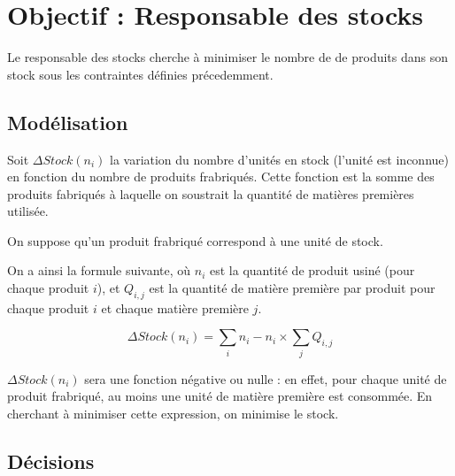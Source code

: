 \newpage
\section{Objectif : Responsable des stocks}
Le responsable des stocks cherche à minimiser le nombre de de produits dans
son stock sous les contraintes définies précedemment.

\subsection{Modélisation}
Soit $\Delta Stock(n_{i})$ la variation du nombre d'unités en stock (l'unité est
inconnue) en fonction du nombre de produits frabriqués. Cette fonction est la
somme des produits fabriqués à laquelle on soustrait la quantité de matières
premières utilisée.

On suppose qu'un produit frabriqué correspond à une unité de stock.

On a ainsi la formule suivante, où $n_{i}$ est la quantité de produit usiné
(pour chaque produit $i$), et $Q_{i,j}$ est la quantité de matière première par
produit pour chaque produit $i$ et chaque matière première $j$.

\begin{equation}
	\Delta Stock(n_{i}) = \sum_{i} n_{i} - n_{i} \times \sum_{j} Q_{i,j}
\end{equation}

$\Delta Stock(n_{i})$ sera une fonction négative ou nulle : en effet, pour
chaque unité de produit frabriqué, au moins une unité de matière première est
consommée. En cherchant à minimiser cette expression, on minimise le stock.

\subsection{Décisions}